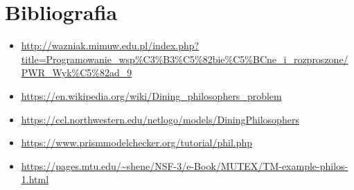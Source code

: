 \documentclass[12pt]{article}
\begin{document}
\newpage
\section{Bibliografia}
\begin{itemize}
    \item \url{http://wazniak.mimuw.edu.pl/index.php?title=Programowanie_wsp%C3%B3%C5%82bie%C5%BCne_i_rozproszone/PWR_Wyk%C5%82ad_9}
    \item \url{https://en.wikipedia.org/wiki/Dining_philosophers_problem}
    \item \url{https://ccl.northwestern.edu/netlogo/models/DiningPhilosophers}
    \item \url{https://www.prismmodelchecker.org/tutorial/phil.php}
    \item \url{https://pages.mtu.edu/~shene/NSF-3/e-Book/MUTEX/TM-example-philos-1.html}

\end{itemize}
\end{document}
